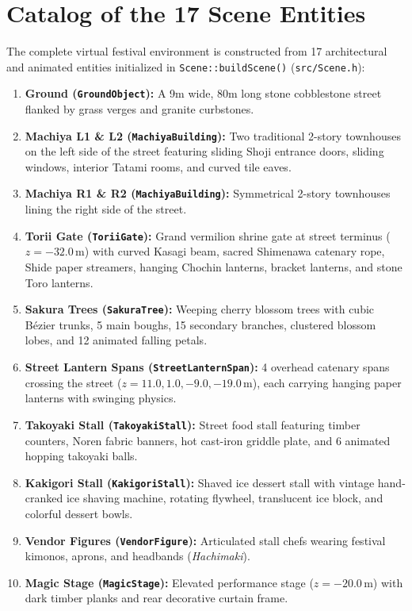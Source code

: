 \section{Catalog of the 17 Scene Entities}
The complete virtual festival environment is constructed from 17 architectural and animated entities initialized in \texttt{Scene::buildScene()} (\texttt{src/Scene.h}):
\begin{enumerate}
    \item \textbf{Ground (\texttt{GroundObject}):} A 9m wide, 80m long stone cobblestone street flanked by grass verges and granite curbstones.
    \item \textbf{Machiya L1 \& L2 (\texttt{MachiyaBuilding}):} Two traditional 2-story townhouses on the left side of the street featuring sliding Shoji entrance doors, sliding windows, interior Tatami rooms, and curved tile eaves.
    \item \textbf{Machiya R1 \& R2 (\texttt{MachiyaBuilding}):} Symmetrical 2-story townhouses lining the right side of the street.
    \item \textbf{Torii Gate (\texttt{ToriiGate}):} Grand vermilion shrine gate at street terminus ($z = -32.0\,\text{m}$) with curved Kasagi beam, sacred Shimenawa catenary rope, Shide paper streamers, hanging Chochin lanterns, bracket lanterns, and stone Toro lanterns.
    \item \textbf{Sakura Trees (\texttt{SakuraTree}):} Weeping cherry blossom trees with cubic B\'ezier trunks, 5 main boughs, 15 secondary branches, clustered blossom lobes, and 12 animated falling petals.
    \item \textbf{Street Lantern Spans (\texttt{StreetLanternSpan}):} 4 overhead catenary spans crossing the street ($z = 11.0, 1.0, -9.0, -19.0\,\text{m}$), each carrying hanging paper lanterns with swinging physics.
    \item \textbf{Takoyaki Stall (\texttt{TakoyakiStall}):} Street food stall featuring timber counters, Noren fabric banners, hot cast-iron griddle plate, and 6 animated hopping takoyaki balls.
    \item \textbf{Kakigori Stall (\texttt{KakigoriStall}):} Shaved ice dessert stall with vintage hand-cranked ice shaving machine, rotating flywheel, translucent ice block, and colorful dessert bowls.
    \item \textbf{Vendor Figures (\texttt{VendorFigure}):} Articulated stall chefs wearing festival kimonos, aprons, and headbands (\textit{Hachimaki}).
    \item \textbf{Magic Stage (\texttt{MagicStage}):} Elevated performance stage ($z = -20.0\,\text{m}$) with dark timber planks and rear decorative curtain frame.

\end{enumerate}
